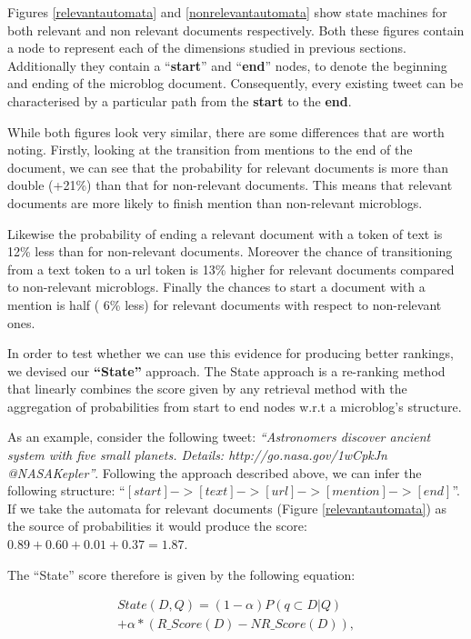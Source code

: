 Figures \ref{relevantautomata} and \ref{nonrelevantautomata} show state machines for both relevant and non relevant documents respectively. Both these figures contain a node to represent each of the dimensions studied in previous sections. Additionally they contain a ``\textbf{start}'' and ``\textbf{end}'' nodes, to denote the beginning and ending of the microblog document. Consequently, every existing tweet can be characterised by a particular path from the \textbf{start} to the \textbf{end}.



While both figures look very similar, there are some differences that are worth noting. Firstly, looking at the transition from mentions to the end of the document, we can see that the probability for relevant documents is more than double (+21\%) than that for non-relevant documents. This means that relevant documents are more likely to finish mention than non-relevant microblogs.

Likewise the probability of ending a relevant document with a token of text is 12\% less than for non-relevant documents. Moreover the chance of transitioning from a text token to a url token is 13\% higher for relevant documents compared to non-relevant microblogs. Finally the chances to start a document with a mention is half ( 6\% less) for relevant documents with respect to non-relevant ones.

In order to test whether we can use this evidence for producing better rankings, we devised our \textbf{``State''} approach. The State approach is a re-ranking method that linearly combines the score given by any retrieval method with the aggregation of probabilities from start to end nodes w.r.t a microblog's structure.



As an example, consider the following tweet: \textit{``Astronomers discover ancient system with five small planets. Details: http://go.nasa.gov/1wCpkJn  @NASAKepler''}. Following the approach described above, we can infer the following structure: ``\([start]->[text]->[url]->[mention]->[end]\)''. If we take the automata for relevant documents (Figure \ref{relevantautomata}) as the source of probabilities it would produce the score: \(0.89 + 0.60 + 0.01 + 0.37 = 1.87\). 



The ``State'' score therefore is given by the following equation:



\begin{equation}
\begin{split}
   State(D,Q) = (1-\alpha)P(q \subset D|Q) \\
   +\alpha * (R\_Score(D) - NR\_Score(D)),
\end{split}
\end{equation}\\



